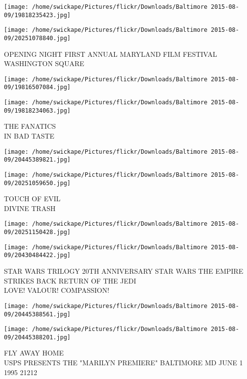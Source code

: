 \documentclass[10pt,letterpaper]{article}
\begin{document}
\texttt{[image: /home/swickape/Pictures/flickr/Downloads/Baltimore 2015-08-09/19818235423.jpg]}

\vspace{0.25in}
\texttt{[image: /home/swickape/Pictures/flickr/Downloads/Baltimore 2015-08-09/20251078840.jpg]}

OPENING NIGHT FIRST ANNUAL MARYLAND FILM FESTIVAL\\
WASHINGTON SQUARE
\pagebreak

\texttt{[image: /home/swickape/Pictures/flickr/Downloads/Baltimore 2015-08-09/19816507084.jpg]}

\vspace{0.25in}
\texttt{[image: /home/swickape/Pictures/flickr/Downloads/Baltimore 2015-08-09/19818234063.jpg]}

THE FANATICS\\
IN BAD TASTE
\pagebreak

\texttt{[image: /home/swickape/Pictures/flickr/Downloads/Baltimore 2015-08-09/20445389821.jpg]}

\vspace{0.25in}
\texttt{[image: /home/swickape/Pictures/flickr/Downloads/Baltimore 2015-08-09/20251059650.jpg]}

TOUCH OF EVIL\\
DIVINE TRASH
\pagebreak

\texttt{[image: /home/swickape/Pictures/flickr/Downloads/Baltimore 2015-08-09/20251150428.jpg]}

\vspace{0.25in}
\texttt{[image: /home/swickape/Pictures/flickr/Downloads/Baltimore 2015-08-09/20430484422.jpg]}

STAR WARS TRILOGY 20TH ANNIVERSARY STAR WARS THE EMPIRE STRIKES BACK RETURN OF THE JEDI\\
LOVE!  VALOUR!  COMPASSION!
\pagebreak

\texttt{[image: /home/swickape/Pictures/flickr/Downloads/Baltimore 2015-08-09/20445388561.jpg]}

\vspace{0.25in}
\texttt{[image: /home/swickape/Pictures/flickr/Downloads/Baltimore 2015-08-09/20445388201.jpg]}

FLY AWAY HOME\\
USPS PRESENTS THE "MARILYN PREMIERE" BALTIMORE MD JUNE 1 1995 21212
\pagebreak
\end{document}

